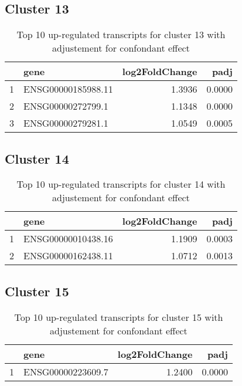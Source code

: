 \documentclass{article}
\begin{document}
\subsection{Cluster 13 }
\begin{table}[H]
\centering
\begin{tabularx}{\textwidth}{rlrr}
  \hline
 & gene & log2FoldChange & padj \\ 
  \hline
1 & ENSG00000185988.11 & 1.3936 & 0.0000 \\ 
  2 & ENSG00000272799.1 & 1.1348 & 0.0000 \\ 
  3 & ENSG00000279281.1 & 1.0549 & 0.0005 \\ 
   \hline
\end{tabularx}
\caption{Top 10 up-regulated transcripts for cluster 13 with adjustement for confondant effect} 
\label{tab:q3_1_conf_13}
\end{table}
\subsection{Cluster 14 }
\begin{table}[H]
\centering
\begin{tabularx}{\textwidth}{rlrr}
  \hline
 & gene & log2FoldChange & padj \\ 
  \hline
1 & ENSG00000010438.16 & 1.1909 & 0.0003 \\ 
  2 & ENSG00000162438.11 & 1.0712 & 0.0013 \\ 
   \hline
\end{tabularx}
\caption{Top 10 up-regulated transcripts for cluster 14 with adjustement for confondant effect} 
\label{tab:q3_1_conf_14}
\end{table}
\subsection{Cluster 15 }
\begin{table}[H]
\centering
\begin{tabularx}{\textwidth}{rlrr}
  \hline
 & gene & log2FoldChange & padj \\ 
  \hline
1 & ENSG00000223609.7 & 1.2400 & 0.0000 \\ 
   \hline
\end{tabularx}
\caption{Top 10 up-regulated transcripts for cluster 15 with adjustement for confondant effect} 
\label{tab:q3_1_conf_15}
\end{table}
\end{document}
